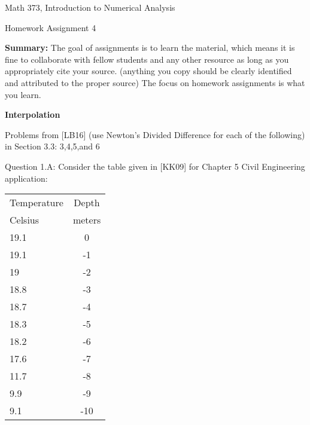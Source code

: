\documentclass{article}
\renewcommand{\cite}[1]{[#1]}
\begin{document}

\large

{\Large Math 373, Introduction to Numerical Analysis}


{\Large Homework Assignment 4} 

{\bf Summary:} {\color{red} The goal of assignments is to learn the material, which means it is fine to collaborate with fellow students and any other resource as long as you appropriately cite your source. (anything you copy should be clearly identified and attributed to the proper source) The focus on homework assignments is what you learn. } 
\par \bigskip \par



{\bf Interpolation} \par \medskip \noindent
Problems from \cite{LB16} (use Newton's Divided Difference for each of the following) in Section 3.3: 3,4,5,and 6  
\par \medskip \noindent
%
Question 1.A:  Consider the table given in \cite{KK09} for Chapter 5 Civil Engineering application: \par
\begin{tabular}{|l|c|}
\hline
Temperature & Depth\\

Celsius & meters\\
\hline
19.1 & 0 \\
\hline
19.1 & -1 \\
\hline
19 & -2 \\
\hline
18.8 & -3 \\
\hline
18.7 & -4 \\
\hline
18.3 & -5 \\
\hline
18.2 & -6 \\
\hline
17.6 & -7 \\
\hline
11.7 & -8 \\
\hline
9.9 & -9 \\
\hline
9.1 & -10 \\
\hline
\end{tabular}
\end{document}
